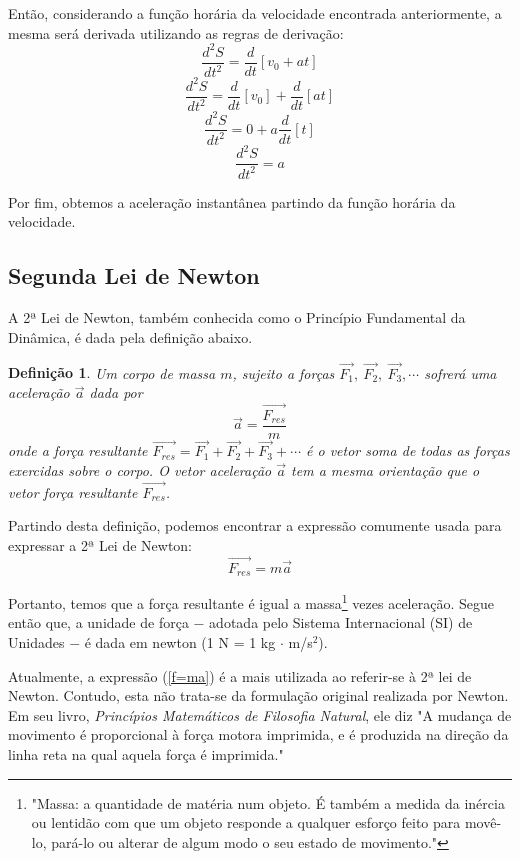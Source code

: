 \documentclass[
	12pt,				%
	openright,			%
    twoside,			%
	a4paper,			%
	chapter=TITLE,		%
	english,			%
	french,				%
	spanish,			%
	brazil				%
	]{abntex2}
\newtheorem{definicao}{Definição}
\numberwithin{lema}{chapter}
\numberwithin{teorema}{chapter}
\numberwithin{definicao}{chapter}
\numberwithin{exemplo}{chapter}
\numberwithin{figure}{chapter}
\begin{document}
Então, considerando a função horária da velocidade encontrada anteriormente, a mesma será derivada utilizando as regras de derivação:
$$\dfrac{d^{2}S}{dt^{2}} = \dfrac{d}{dt}[v_0 + at]$$
$$\dfrac{d^{2}S}{dt^{2}} = \dfrac{d}{dt}[v_0] + \dfrac{d}{dt}[at]$$
$$\dfrac{d^{2}S}{dt^{2}} = 0 + a\dfrac{d}{dt}[t]$$
$$\dfrac{d^{2}S}{dt^{2}} = a$$

Por fim, obtemos a aceleração instantânea partindo da função horária da velocidade.

\subsection{Segunda Lei de Newton}

A 2ª Lei de Newton, também conhecida como o Princípio Fundamental da Dinâmica, é dada pela definição abaixo.

\begin{definicao}
	\label{definicao_2_lei}
	\cite{uma_abordagem}
	Um corpo de massa $m$, sujeito a forças $\vec{F_1}, \ \vec{F_2}, \ \vec{F_3}, \cdots$ sofrerá uma  aceleração $\vec{a}$ dada por	
	$$\vec{a} = \dfrac{\vec{F_{res}}}{m}$$	
	onde a força resultante $\vec{F_{res}} = \vec{F_1} + \vec{F_2} + \vec{F_3} + \cdots$ é o vetor soma de todas as forças exercidas sobre o corpo. O vetor aceleração $\vec{a}$ tem a mesma orientação que o vetor força resultante $\vec{F_{res}}$.
\end{definicao}
	  
Partindo desta definição, podemos encontrar a expressão comumente usada para expressar a 2ª Lei de Newton:
\begin{equation}
	\label{f=ma}
	\vec{F_{res}} = m\vec{a}
\end{equation}

Portanto, temos que a força resultante é igual a massa\footnote{"Massa: a quantidade de matéria num objeto. É também a medida da inércia ou lentidão com que um objeto responde a qualquer esforço feito para movê-lo, pará-lo ou alterar de algum modo o seu estado de movimento."\cite[p.85]{fisica_conceitual}} vezes aceleração. Segue então que, a unidade de força $-$ adotada pelo Sistema Internacional (SI) de Unidades $-$ é dada em newton (1 N = 1 kg $\cdot$ m/s$^{2}$).

Atualmente, a expressão (\ref{f=ma}) é a mais utilizada ao referir-se à 2ª lei de Newton. Contudo, esta não trata-se da formulação original realizada por Newton. Em seu livro, \textit{Princípios Matemáticos de Filosofia Natural}, ele diz "A mudança de movimento é proporcional à força motora imprimida, e é produzida na direção da linha reta na qual aquela força é imprimida."\cite{principios}
\end{document}
